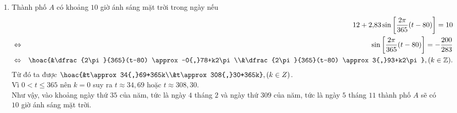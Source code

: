 \begin{ex}
{\begin{enumerate}
			\item Thành phố $A$ có khoảng $10$ giờ ánh sáng mặt  trời trong ngày nếu
			 \allowdisplaybreaks
			\begin{eqnarray*}
				 & &12+2{,}83\sin \left[\dfrac{2\pi}{365} (t-80) \right]=10\\
				& \Leftrightarrow& \sin \left[\dfrac{2\pi}{365} (t-80) \right] =-\dfrac{200}{283}\\ &  \Leftrightarrow&
				\hoac{&\dfrac{2\pi}{365}(t-80) \approx -0{,}78+k2\pi\\&\dfrac{2\pi}{365}(t-80) \approx 3{,}93+k2\pi},  (k\in\mathbb{Z}).
			\end{eqnarray*}
			Từ đó ta được $\hoac{&t\approx 34{,}69+365k\\&t\approx 308{,}30+365k}, (k\in Z)$.\\ 
			Vì $0<t\le 365$ nên $k=0$ suy ra  $t\approx 34{,}69$ hoặc $t\approx 308{,}30$.\\
			Như vậy, vào khoảng ngày thứ $35$ của năm, tức  là ngày $4$ tháng $2$ và ngày thứ $309$ của năm, tức là ngày $5$ tháng $11$ thành phố $A$ sẽ có $10$ giờ ánh sáng mặt trời.
		\end{enumerate}
	 }
\end{ex}

